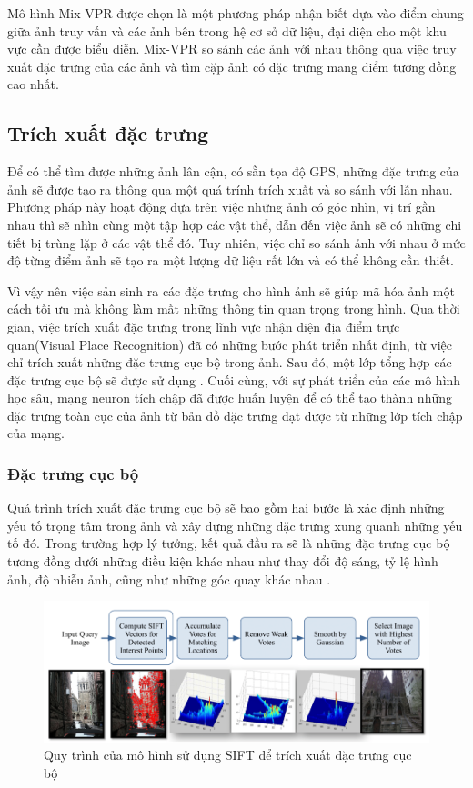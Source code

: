 Mô hình Mix-VPR được chọn là một phương pháp nhận biết dựa vào điểm chung giữa ảnh truy vấn và các ảnh bên trong hệ cơ sở dữ liệu, đại diện cho một khu vực cần được biểu diễn. Mix-VPR so sánh các ảnh với nhau thông qua việc truy xuất đặc trưng của các ảnh và tìm cặp ảnh có đặc trưng mang điểm tương đồng cao nhất.

\subsection{Trích xuất đặc trưng}
Để có thể tìm được những ảnh lân cận, có sẵn tọa độ GPS, những đặc trưng của ảnh sẽ được tạo ra thông qua một quá trính trích xuất và so sánh với lẫn nhau. Phương pháp này hoạt động dựa trên việc những ảnh có góc nhìn, vị trí gần nhau thì sẽ nhìn cùng một tập hợp các vật thể, dẫn đến việc ảnh sẽ có những chi tiết bị trùng lặp ở các vật thể đó. Tuy nhiên, việc chỉ so sánh ảnh với nhau ở mức độ từng điểm ảnh sẽ tạo ra một lượng dữ liệu rất lớn và có thể không cần thiết.

Vì vậy nên việc sản sinh ra các đặc trưng cho hình ảnh sẽ giúp mã hóa ảnh một cách tối ưu mà không làm mất những thông tin quan trọng trong hình. Qua thời gian, việc trích xuất đặc trưng trong lĩnh vực nhận diện địa điểm trực quan(Visual Place Recognition) đã có những bước phát triển nhất định, từ việc chỉ trích xuất những đặc trưng cục bộ trong ảnh. Sau đó, một lớp tổng hợp các đặc trưng cục bộ sẽ được sử dụng \cite{pion2020benchmarking}. Cuối cùng, với sự phát triển của các mô hình học sâu, mạng neuron tích chập đã được huấn luyện để có thể tạo thành những đặc trưng toàn cục của ảnh từ bản đồ đặc trưng đạt được từ những lớp tích chập của mạng.
\subsubsection*{Đặc trưng cục bộ}
Quá trình trích xuất đặc trưng cục bộ sẽ bao gồm hai bước là xác định những yếu tố trọng tâm trong ảnh và xây dựng những đặc trưng xung quanh những yếu tố đó. Trong trường hợp lý tưởng, kết quả đầu ra sẽ là những đặc trưng cục bộ tương đồng dưới những điều kiện khác nhau như thay đổi độ sáng, tỷ lệ hình ảnh, độ nhiễu ảnh, cũng như những góc quay khác nhau \cite{lowe1999object}.

\begin{figure}[H]
  \centering
  \includegraphics[scale=0.5]{pics/Chapter3/SIFT.png}
  \caption{Quy trình của mô hình sử dụng SIFT để trích xuất đặc trưng cục bộ \cite{zamir2010accurate}}
  \label{fig:enter-label}
\end{figure}

